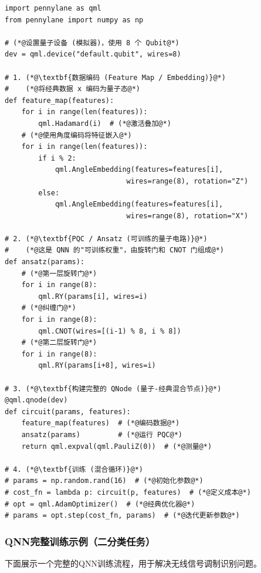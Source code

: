 \documentclass[11pt,a4paper]{article}
\begin{document}
\begin{lstlisting}[caption={PennyLane QNN 示例代码}]
import pennylane as qml
from pennylane import numpy as np

# (*@设置量子设备 (模拟器)，使用 8 个 Qubit@*)
dev = qml.device("default.qubit", wires=8)

# 1. (*@\textbf{数据编码 (Feature Map / Embedding)}@*)
#    (*@将经典数据 x 编码为量子态@*)
def feature_map(features):
    for i in range(len(features)):
        qml.Hadamard(i)  # (*@激活叠加@*)
    # (*@使用角度编码将特征嵌入@*)
    for i in range(len(features)):
        if i % 2:
            qml.AngleEmbedding(features=features[i], 
                             wires=range(8), rotation="Z")
        else:
            qml.AngleEmbedding(features=features[i], 
                             wires=range(8), rotation="X")

# 2. (*@\textbf{PQC / Ansatz (可训练的量子电路)}@*)
#    (*@这是 QNN 的"可训练权重"，由旋转门和 CNOT 门组成@*)
def ansatz(params):
    # (*@第一层旋转门@*)
    for i in range(8):
        qml.RY(params[i], wires=i)
    # (*@纠缠门@*)
    for i in range(8):
        qml.CNOT(wires=[(i-1) % 8, i % 8])
    # (*@第二层旋转门@*)
    for i in range(8):
        qml.RY(params[i+8], wires=i)

# 3. (*@\textbf{构建完整的 QNode (量子-经典混合节点)}@*)
@qml.qnode(dev)
def circuit(params, features):
    feature_map(features)  # (*@编码数据@*)
    ansatz(params)         # (*@运行 PQC@*)
    return qml.expval(qml.PauliZ(0))  # (*@测量@*)

# 4. (*@\textbf{训练 (混合循环)}@*)
# params = np.random.rand(16)  # (*@初始化参数@*)
# cost_fn = lambda p: circuit(p, features)  # (*@定义成本@*)
# opt = qml.AdamOptimizer()  # (*@经典优化器@*)
# params = opt.step(cost_fn, params)  # (*@迭代更新参数@*)
\end{lstlisting}

\subsubsection{QNN完整训练示例（二分类任务）}

下面展示一个完整的QNN训练流程，用于解决无线信号调制识别问题。
\end{document}
